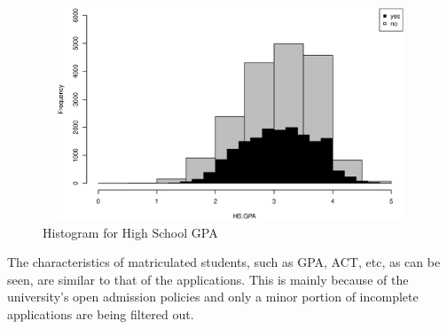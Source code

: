 \documentclass[12pt,english]{report}
\begin{document}
\begin{figure} [H]
\includegraphics[width=6in, height=2.5in]{pic/enroll_gpa}
\caption{Histogram for High School GPA  } \label{enroll_gpa}
\end{figure}


The characteristics of matriculated students, such as GPA, ACT, etc, as can be seen, are similar to that of the applications.  This is mainly because of the  university's open admission policies and only a minor portion of incomplete applications are being filtered out.  



\end{document}
